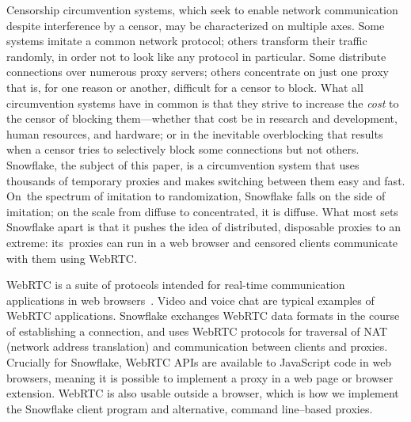 \documentclass[letterpaper,twocolumn]{article}
\begin{document}
Censorship circumvention systems,
which seek to enable network communication
despite interference by a censor,
may be characterized on multiple axes.
Some systems imitate a common network protocol;
others transform their traffic randomly, in order
not to look like any protocol in particular.
Some distribute connections over numerous proxy servers;
others concentrate on just one proxy
that is, for one reason or another, difficult for a censor to block.
What all circumvention systems have in common
is that they strive to increase the \emph{cost}
to the censor of blocking them---whether that cost be in
research and development, human resources, and hardware;
or in the inevitable overblocking that results
when a censor tries to selectively block
some connections but not others.
Snowflake, the subject of this paper,
is a circumvention system that
uses thousands of temporary proxies
and makes switching between them easy and fast.
On~the spectrum of imitation to randomization,
Snowflake falls on the side of imitation;
on the scale from diffuse to concentrated, it is diffuse.
What most sets Snowflake apart is that
it pushes the idea of distributed, disposable
proxies to an extreme:
its~proxies can run in a web browser
and censored clients communicate with them using WebRTC.

WebRTC is a suite of protocols
intended for real-time communication applications
in web browsers~\cite{rfc8825}.
Video and voice chat are typical examples
of WebRTC applications.
Snowflake exchanges WebRTC data formats
in the course of establishing a connection,
and uses WebRTC protocols for traversal of NAT (network address translation)
and communication between clients and proxies.
Crucially for Snowflake, WebRTC APIs
are available to JavaScript code in web browsers,
meaning it is possible to implement a proxy
in a web page or browser extension.
WebRTC is also usable outside a browser,
which is how we implement the Snowflake client program
and alternative, command line--based proxies.
\end{document}
